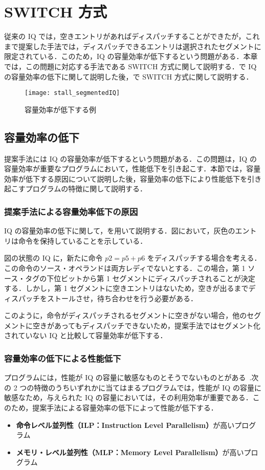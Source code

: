 \chapter{SWITCH 方式}
\label{sec:switch}
従来の IQ では，空きエントリがあればディスパッチすることができたが，これまで提案した手法では，ディスパッチできるエントリは選択されたセグメントに限定されている．このため，IQ の容量効率が低下するという問題がある．本章では，この問題に対応する手法である SWITCH  方式に関して説明する．で IQ の容量効率の低下に関して説明した後，で SWITCH 方式に関して説明する．

\begin{figure}[tb]
  \centering
  \texttt{[image: stall\_segmentedIQ]}
  \caption{容量効率が低下する例}
  \label{fig:stall_segmentedIQ}
\end{figure}


\section{容量効率の低下}
\label{sec:occupency_reduction}
提案手法には IQ の容量効率が低下するという問題がある．この問題は，IQ の容量効率が重要なプログラムにおいて，性能低下を引き起こす．本節では，容量効率が低下する原因について説明した後，容量効率の低下により性能低下を引き起こすプログラムの特徴に関して説明する．

\subsection{提案手法による容量効率低下の原因}
IQ の容量効率の低下に関して，を用いて説明する．図において，灰色のエントリは命令を保持していることを示している．

図の状態の IQ に，新たに命令 $p2 = p5 + p6$ をディスパッチする場合を考える．この命令のソース・オペランドは両方レディでないとする．この場合，第 1 ソース・タグの下位ビットから第 1 セグメントにディスパッチされることが決定する．しかし，第 1 セグメントに空きエントリはないため，空きが出るまでディスパッチをストールさせ，待ち合わせを行う必要がある．

このように，命令がディスパッチされるセグメントに空きがない場合，他のセグメントに空きがあってもディスパッチできないため，提案手法ではセグメント化されていない IQ と比較して容量効率が低下する．

\subsection{容量効率の低下による性能低下}
プログラムには，性能が IQ の容量に敏感なものとそうでないものとがある~\cite{Ando2019, Kora2013, Sembrant2015}.次の 2 つの特徴のうちいずれかに当てはまるプログラムでは，性能が IQ の容量に敏感なため，与えられた IQ の容量においては，その利用効率が重要である．このため，提案手法による容量効率の低下によって性能が低下する．
\begin{itemize}
  \item \textbf{命令レベル並列性（ILP：Instruction Level Parallelism）}が高いプログラム
  \item \textbf{メモリ・レベル並列性（MLP：Memory Level Parallelism）}が高いプログラム 
\end{itemize}

